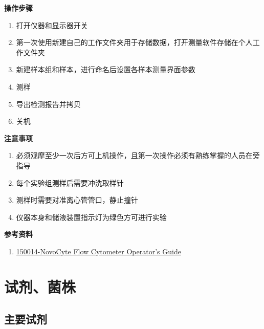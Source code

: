\documentclass[
]{book}
\providecommand{\tightlist}{%
  \setlength{\itemsep}{0pt}\setlength{\parskip}{0pt}}
\begin{document}
\textbf{操作步骤}

\begin{enumerate}
\def\labelenumi{\arabic{enumi}.}
\tightlist
\item
  打开仪器和显示器开关
\item
  第一次使用新建自己的工作文件夹用于存储数据，打开测量软件存储在个人工作文件夹
\item
  新建样本组和样本，进行命名后设置各样本测量界面参数
\item
  测样
\item
  导出检测报告并拷贝
\item
  关机
\end{enumerate}

\textbf{注意事项}

\begin{enumerate}
\def\labelenumi{\arabic{enumi}.}
\tightlist
\item
  必须观摩至少一次后方可上机操作，且第一次操作必须有熟练掌握的人员在旁指导
\item
  每个实验组测样后需要冲洗取样针
\item
  测样时需要对准离心管管口，静止撞针
\item
  仪器本身和储液装置指示灯为绿色方可进行实验
\end{enumerate}

\textbf{参考资料}

\begin{enumerate}
\def\labelenumi{\arabic{enumi}.}
\tightlist
\item
  \href{https://www.agilent.com.cn/cs/library/usermanuals/public/150014-NovoCyte\%20Flow\%20Cytometer\%20Operator\textquotesingle{}s\%20Guide\%20(RUO).pdf}{150014-NovoCyte
  Flow Cytometer Operator's Guide}
\end{enumerate}

\hypertarget{materials}{%
\chapter{试剂、菌株}\label{materials}}

\hypertarget{ux4e3bux8981ux8bd5ux5242}{%
\section{主要试剂}\label{ux4e3bux8981ux8bd5ux5242}}
\end{document}
